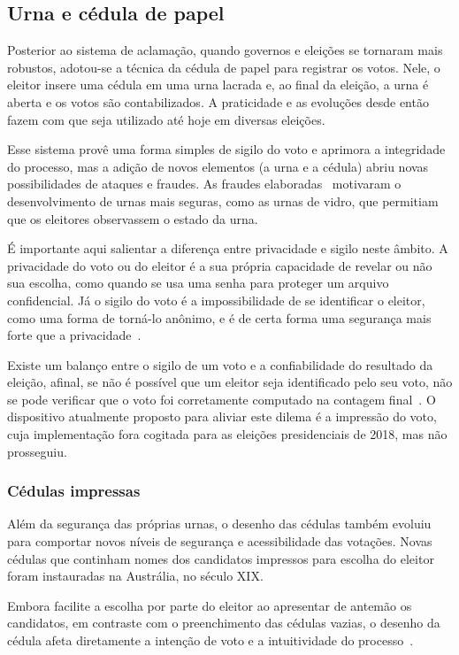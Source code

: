 \subsection{Urna e cédula de papel}

Posterior ao sistema de aclamação, quando governos e eleições se tornaram mais
robustos, adotou-se a técnica da cédula de papel para registrar os votos. Nele,
o eleitor insere uma cédula em uma urna lacrada e, ao final da eleição, a urna
é aberta e os votos são contabilizados. A praticidade e as evoluções desde
então fazem com que seja utilizado até hoje em diversas eleições.

Esse sistema provê uma forma simples de sigilo do voto e aprimora a integridade
do processo, mas a adição de novos elementos (a urna e a cédula) abriu novas
possibilidades de ataques e fraudes. As fraudes elaboradas~\nocite{leslie1856}
motivaram o desenvolvimento de urnas mais seguras, como as urnas de vidro, que
permitiam que os eleitores observassem o estado da urna.

É importante aqui salientar a diferença entre privacidade e sigilo neste
âmbito. A privacidade do voto ou do eleitor é a sua própria capacidade de
revelar ou não sua escolha, como quando se usa uma senha para proteger um
arquivo confidencial. Já o sigilo do voto é a impossibilidade de se identificar
o eleitor, como uma forma de torná-lo anônimo, e é de certa forma uma segurança
mais forte que a privacidade~\cite{coney2005towards}.

Existe um balanço entre o sigilo de um voto e a confiabilidade do resultado da
eleição, afinal, se não é possível que um eleitor seja identificado pelo seu
voto, não se pode verificar que o voto foi corretamente computado na contagem
final~\cite{jones2012broken}. O dispositivo atualmente proposto para aliviar
este dilema é a impressão do voto, cuja implementação fora cogitada para as
eleições presidenciais de 2018, mas não prosseguiu.

\subsubsection{Cédulas impressas}

Além da segurança das próprias urnas, o desenho das cédulas também evoluiu para
comportar novos níveis de segurança e acessibilidade das votações. Novas
cédulas que continham nomes dos candidatos impressos para escolha do eleitor
foram instauradas na Austrália, no século XIX.

Embora facilite a escolha por parte do eleitor ao apresentar de antemão os
candidatos, em contraste com o preenchimento das cédulas vazias, o desenho da
cédula afeta diretamente a intenção de voto e a intuitividade do
processo~\cite{everett2006measuring}.

